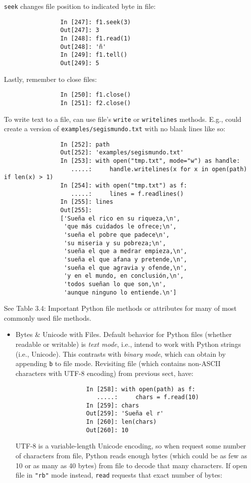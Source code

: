 \documentclass{article}
\begin{document}
\begin{enumerate}
\begin{itemize}
\begin{itemize}
			{\tt seek} changes file position to indicated byte in file:
			\begin{verbatim}
				In [247]: f1.seek(3)
				Out[247]: 3
				In [248]: f1.read(1)
				Out[248]: 'ñ'
				In [249]: f1.tell()
				Out[249]: 5
			\end{verbatim}
			Lastly, remember to close files:
			\begin{verbatim}
				In [250]: f1.close()
				In [251]: f2.close()
			\end{verbatim}
			To write text to a file, can use file's {\tt write} or {\tt writelines} methods. E.g., could create a version of {\tt examples/segismundo.txt} with no blank lines like so:
			\begin{verbatim}
				In [252]: path
				Out[252]: 'examples/segismundo.txt'
				In [253]: with open("tmp.txt", mode="w") as handle:
				   .....:     handle.writelines(x for x in open(path) if len(x) > 1)
				In [254]: with open("tmp.txt") as f:
				   .....:     lines = f.readlines()
				In [255]: lines
				Out[255]:
				['Sueña el rico en su riqueza,\n',
				 'que más cuidados le ofrece;\n',
				 'sueña el pobre que padece\n',
				 'su miseria y su pobreza;\n',
				 'sueña el que a medrar empieza,\n',
				 'sueña el que afana y pretende,\n',
				 'sueña el que agravia y ofende,\n',
				 'y en el mundo, en conclusión,\n',
				 'todos sueñan lo que son,\n',
				 'aunque ninguno lo entiende.\n']
			\end{verbatim}
			See {\sf Table 3.4: Important Python file methods or attributes} for many of most commonly used file methods.
			\begin{itemize}
				\item {\sf Bytes \& Unicode with Files.} Default behavior for Python files (whether readable or writable) is {\it text mode}, i.e., intend to work with Python strings (i.e., Unicode). This contrasts with {\it binary mode}, which can obtain by appending {\tt b} to file mode. Revisiting file (which contains non-ASCII characters with UTF-8 encoding) from previous sect, have:
				\begin{verbatim}
					In [258]: with open(path) as f:
					   .....:     chars = f.read(10)
					In [259]: chars
					Out[259]: 'Sueña el r'
					In [260]: len(chars)
					Out[260]: 10
				\end{verbatim}
				UTF-8 is a variable-length Unicode encoding, so when request some number of characters from file, Python reads enough bytes (which could be as few as 10 or as many as 40 bytes) from file to decode that many characters. If open file in {\tt"rb"} mode instead, {\tt read} requests that exact number of bytes:

\end{itemize}
\end{itemize}
\end{itemize}
\end{enumerate}
\end{document}
